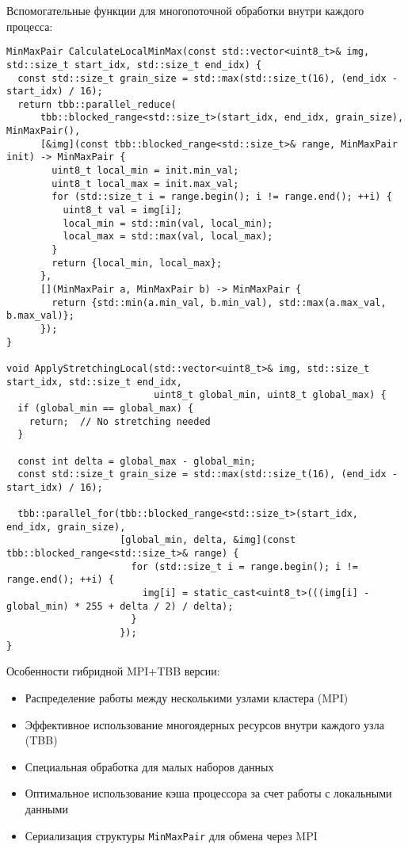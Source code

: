 \documentclass[a4paper,14pt]{article}
\begin{document}
Вспомогательные функции для многопоточной обработки внутри каждого процесса:

\begin{lstlisting}[caption=Вспомогательные функции для MPI+TBB]
MinMaxPair CalculateLocalMinMax(const std::vector<uint8_t>& img, std::size_t start_idx, std::size_t end_idx) {
  const std::size_t grain_size = std::max(std::size_t(16), (end_idx - start_idx) / 16);
  return tbb::parallel_reduce(
      tbb::blocked_range<std::size_t>(start_idx, end_idx, grain_size), MinMaxPair(),
      [&img](const tbb::blocked_range<std::size_t>& range, MinMaxPair init) -> MinMaxPair {
        uint8_t local_min = init.min_val;
        uint8_t local_max = init.max_val;
        for (std::size_t i = range.begin(); i != range.end(); ++i) {
          uint8_t val = img[i];
          local_min = std::min(val, local_min);
          local_max = std::max(val, local_max);
        }
        return {local_min, local_max};
      },
      [](MinMaxPair a, MinMaxPair b) -> MinMaxPair {
        return {std::min(a.min_val, b.min_val), std::max(a.max_val, b.max_val)};
      });
}

void ApplyStretchingLocal(std::vector<uint8_t>& img, std::size_t start_idx, std::size_t end_idx, 
                          uint8_t global_min, uint8_t global_max) {
  if (global_min == global_max) {
    return;  // No stretching needed
  }

  const int delta = global_max - global_min;
  const std::size_t grain_size = std::max(std::size_t(16), (end_idx - start_idx) / 16);

  tbb::parallel_for(tbb::blocked_range<std::size_t>(start_idx, end_idx, grain_size),
                    [global_min, delta, &img](const tbb::blocked_range<std::size_t>& range) {
                      for (std::size_t i = range.begin(); i != range.end(); ++i) {
                        img[i] = static_cast<uint8_t>(((img[i] - global_min) * 255 + delta / 2) / delta);
                      }
                    });
}
\end{lstlisting}

Особенности гибридной MPI+TBB версии:
\begin{itemize}
    \item Распределение работы между несколькими узлами кластера (MPI)
    \item Эффективное использование многоядерных ресурсов внутри каждого узла (TBB)
    \item Специальная обработка для малых наборов данных
    \item Оптимальное использование кэша процессора за счет работы с локальными данными
    \item Сериализация структуры \texttt{MinMaxPair} для обмена через MPI
\end{itemize}
\end{document}

